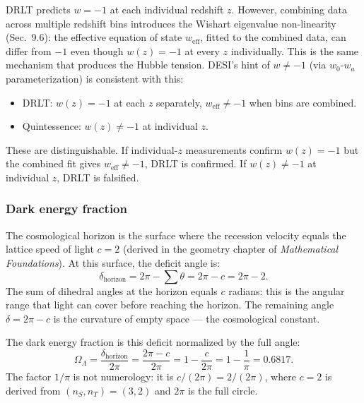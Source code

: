 \begin{remark}
DRLT predicts $w = -1$ at each individual redshift $z$. However, combining data across multiple redshift bins introduces the Wishart eigenvalue non-linearity (Sec.~9.6): the effective equation of state $w_\text{eff}$, fitted to the combined data, can differ from $-1$ even though $w(z) = -1$ at every $z$ individually. This is the same mechanism that produces the Hubble tension. DESI's hint of $w \neq -1$ (via $w_0$-$w_a$ parameterization) is consistent with this:

\begin{itemize}
\item DRLT: $w(z) = -1$ at each $z$ separately, $w_\text{eff} \neq -1$ when bins are combined.
\item Quintessence: $w(z) \neq -1$ at individual $z$.
\end{itemize}

These are distinguishable. If individual-$z$ measurements confirm $w(z) = -1$ but the combined fit gives $w_\text{eff} \neq -1$, DRLT is confirmed. If $w(z) \neq -1$ at individual $z$, DRLT is falsified.
\end{remark}

\subsubsection{Dark energy fraction}

The cosmological horizon is the surface where the recession velocity equals the lattice speed of light $c = 2$ (derived in the geometry chapter of \textit{Mathematical Foundations}). At this surface, the deficit angle is:
\begin{equation}
\delta_\text{horizon} = 2\pi - \sum\theta = 2\pi - c = 2\pi - 2.
\end{equation}
The sum of dihedral angles at the horizon equals $c$ radians: this is the angular range that light can cover before reaching the horizon. The remaining angle $\delta = 2\pi - c$ is the curvature of empty space --- the cosmological constant.

The dark energy fraction is this deficit normalized by the full angle:
\begin{equation}
\boxed{\Omega_\Lambda = \frac{\delta_\text{horizon}}{2\pi} = \frac{2\pi - c}{2\pi} = 1 - \frac{c}{2\pi} = 1 - \frac{1}{\pi} = 0.6817.}
\end{equation}
The factor $1/\pi$ is not numerology: it is $c/(2\pi) = 2/(2\pi)$, where $c = 2$ is derived from $(n_S, n_T) = (3, 2)$ and $2\pi$ is the full circle.

